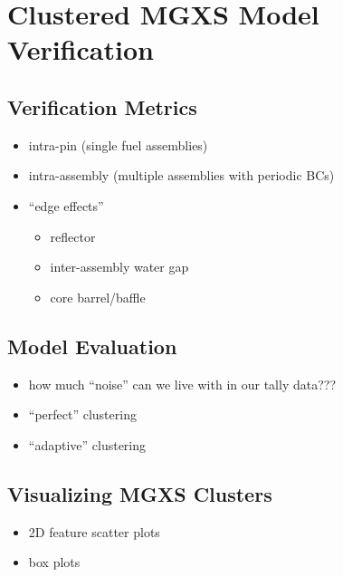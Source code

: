 \chapter{Clustered MGXS Model Verification}
\label{chap:results}


\section{Verification Metrics}
\label{sec:chap7-verify}

\begin{itemize}[noitemsep]
  \item intra-pin (single fuel assemblies)
  \item intra-assembly (multiple assemblies with periodic BCs)
  \item ``edge effects''
  \begin{itemize}[noitemsep]
    \item reflector
    \item inter-assembly water gap
    \item core barrel/baffle
  \end{itemize}
\end{itemize}


\section{Model Evaluation}
\label{sec:chap7-evaluate}

\begin{itemize}[noitemsep]
  \item how much ``noise'' can we live with in our tally data???
  \item ``perfect'' clustering
  \item ``adaptive'' clustering
\end{itemize}


\section{Visualizing MGXS Clusters}
\label{sec:chap7-visuals}

\begin{itemize}[noitemsep]
  \item 2D feature scatter plots
  \item box plots
\end{itemize}


